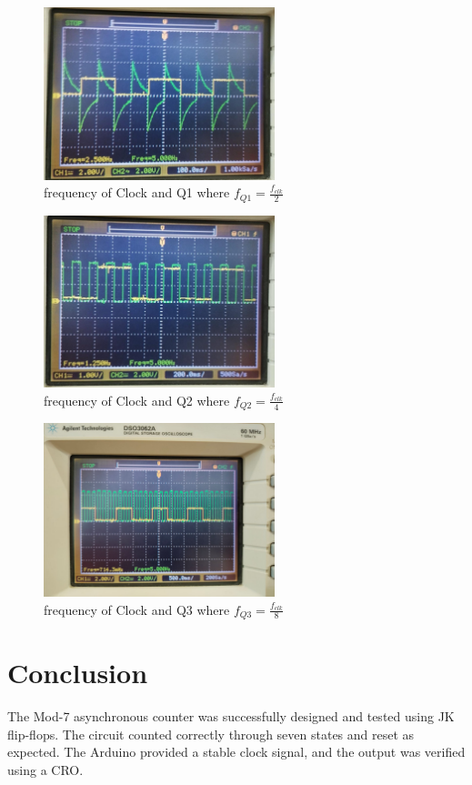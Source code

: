 \documentclass[a4paper,12pt]{article}
\begin{document}
\begin{figure}[H]
\centering
\includegraphics[width=0.6\textwidth]{figs/fig1.jpeg}
\caption{frequency of Clock and Q1 where $f_{Q1} = \frac{f_{clk}}{2}$}
\end{figure}
\begin{figure}[H]
\centering
\includegraphics[width=0.6\textwidth]{figs/fig2.jpeg}
\caption{frequency of Clock and Q2 where $f_{Q2} = \frac{f_{clk}}{4}$}
\end{figure}
\begin{figure}[H]
\centering
\includegraphics[width=0.6\textwidth]{figs/fig3.jpeg}
\caption{frequency of Clock and Q3 where $f_{Q3} = \frac{f_{clk}}{8}$}
\end{figure}
\section{Conclusion}
The Mod-7 asynchronous counter was successfully designed and tested using JK flip-flops. The circuit counted correctly through seven states and reset as expected. The Arduino provided a stable clock signal, and the output was verified using a CRO.
\end{document}
